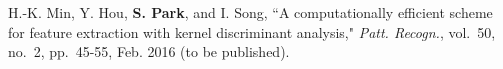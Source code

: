 \documentclass[master,english,final]{kaist-ucs}
\begin{document}

    \begin{publication}
        \item H.-K. Min, Y. Hou, {\bf S. Park}, and I. Song,
``A computationally efficient scheme for feature extraction with kernel discriminant analysis,"
\textit{Patt. Recogn.}, vol.~50, no.~2, pp.~45-55, Feb. 2016 (to be published).
    \end{publication}

  \label{paperlastpagelabel}     %
\end{document}
